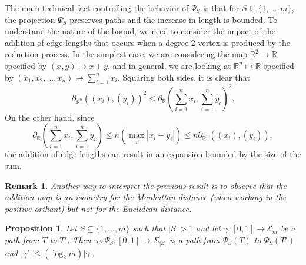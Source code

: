 \documentclass[a4paper,11pt]{article}
\newtheorem{proposition}[theorem]{Proposition}
\newtheorem{remark}[theorem]{Remark}
\newcommand{\aE}{\mathcal{E}}
\begin{document}
The main technical fact controlling the behavior of $\Psi_S$ is that for $S \subseteq \{1,\ldots,m\}$, the projection $\Psi_S$ preserves paths and the increase in length is bounded.
To understand the nature of the bound, we need to consider the impact of the addition of edge lengths that occurs when a degree 2 vertex is produced by the reduction process.
In the simplest case, we are considering the map $\mathbb{R}^2 \to \mathbb{R}$ specified by $(x,y) \mapsto x+y$, and in general, we are looking at $\mathbb{R}^n \mapsto \mathbb{R}$ specified by $(x_1, x_2, \ldots, x_n) \mapsto \sum_{i=1}^n x_i$.
Squaring both sides, it is clear that
\[
\partial_{\mathbb{R}^n}((x_i), (y_i))^2 \leq \partial_{\mathbb{R}}(\sum_{i=1}^n x_i, \sum_{i=1}^n y_i)^2.
\]
On the other hand, since 
\[
\partial_{\mathbb{R}}(\sum_{i=1}^n x_i, \sum_{i=1}^n y_i) \leq n(\max_i |x_i - y_i|) \leq n \partial_{\mathbb{R}^n}((x_i), (y_i)),
\]
the addition of edge lengths can result in an expansion bounded by the size of the sum.

\begin{remark}
Another way to interpret the previous result is to observe that the addition map is an isometry for the Manhattan distance (when working in the positive orthant) but not for the Euclidean distance.
\end{remark}

\begin{proposition}\label{prop:projcont}
Let $S \subseteq \{1,\ldots,m\}$ such that $|S| > 1$ and let $\gamma \colon [0,1] \to \aE_m$ be a path from $T$ to $T'$.
Then $\gamma \circ \Psi_S \colon [0,1] \to \Sigma_{|S|}$ is a path from $\Psi_S(T)$ to $\Psi_S(T')$ and $|\gamma'| \leq (\log_2 m) |\gamma|$.
\end{proposition}
\end{document}

